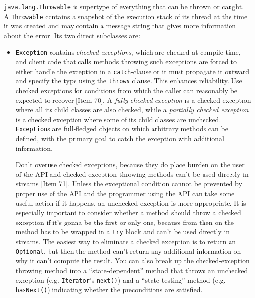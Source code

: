 \documentclass[table, xcdraw]{article}%
\begin{document}
\texttt{java.lang.Throwable} is supertype of everything that can be thrown or caught. A \texttt{Throwable} contains a snapshot of the execution stack of its thread at the time it was created and may contain a message string that gives more information about the error. Its two direct subclasses are:
\begin{itemize}
    \item \texttt{Exception} contains \emph{checked exceptions}, which are checked at compile time, and client code that calls methods throwing such exceptions are forced to either handle the exception in a \texttt{catch}-clause or it must propagate it outward and specify the type using the \texttt{throws} clause. This enhances reliability. Use checked exceptions for conditions from which the caller can reasonably be expected to recover [Item 70]. A \emph{fully checked exception} is a checked exception where all its child classes are also checked, while a \emph{partially checked exception} is a checked exception where some of its child classes are unchecked. \texttt{Exception}s are full-fledged objects on which arbitrary methods can be defined, with the primary goal to catch the exception with additional information.

    Don't overuse checked exceptions, because they do place burden on the user of the API and checked-exception-throwing methods can't be used directly in streams [Item 71]. Unless the exceptional condition cannot be prevented by proper use of the API and the programmer using the API can take some useful action if it happens, an unchecked exception is more appropriate. It is especially important to consider whether a method should throw a checked exception if it's gonna be the first or only one, because from then on the method has to be wrapped in a \texttt{try} block and can't be used directly in streams. The easiest way to eliminate a checked exception is to return an \texttt{Optional}, but then the method can’t return any additional information on why it can't compute the result. You can also break up the checked-exception throwing method into a “state-dependent” method that throws an unchecked exception (e.g. \texttt{Iterator}'s \texttt{next()}) and a “state-testing” method (e.g. \texttt{hasNext()}) indicating whether the preconditions are satisfied.
    

\end{itemize}
\end{document}

